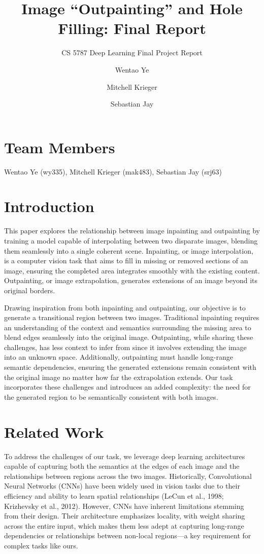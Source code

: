 \documentclass[sigconf]{acmart}
\title{Image “Outpainting” and Hole Filling: Final Report}
\subtitle{CS 5787 Deep Learning Final Project Report}
\author{Wentao Ye}
\affiliation{%
  \institution{Cornell University}
}
\author{Mitchell Krieger}
\affiliation{%
  \institution{Cornell University}
}
\author{Sebastian Jay}
\affiliation{%
  \institution{Cornell University}
}
\begin{document}
\maketitle

\section*{Team Members}
Wentao Ye (wy335), Mitchell Krieger (mak483), Sebastian Jay (srj63)

\section*{Introduction}
This paper explores the relationship between image inpainting and outpainting by training a model capable of interpolating between two disparate images, blending them seamlessly into a single coherent scene. Inpainting, or image interpolation, is a computer vision task that aims to fill in missing or removed sections of an image, ensuring the completed area integrates smoothly with the existing content. Outpainting, or image extrapolation, generates extensions of an image beyond its original borders.

Drawing inspiration from both inpainting and outpainting, our objective is to generate a transitional region between two images. Traditional inpainting requires an understanding of the context and semantics surrounding the missing area to blend edges seamlessly into the original image. Outpainting, while sharing these challenges, has less context to infer from since it involves extending the image into an unknown space. Additionally, outpainting must handle long-range semantic dependencies, ensuring the generated extensions remain consistent with the original image no matter how far the extrapolation extends. Our task incorporates these challenges and introduces an added complexity: the need for the generated region to be semantically consistent with both images.

\section*{Related Work}
To address the challenges of our task, we leverage deep learning architectures capable of capturing both the semantics at the edges of each image and the relationships between regions across the two images. Historically, Convolutional Neural Networks (CNNs) have been widely used in vision tasks due to their efficiency and ability to learn spatial relationships (LeCun et al., 1998; Krizhevsky et al., 2012). However, CNNs have inherent limitations stemming from their design. Their architecture emphasizes locality, with weight sharing across the entire input, which makes them less adept at capturing long-range dependencies or relationships between non-local regions—a key requirement for complex tasks like ours.
\end{document}
